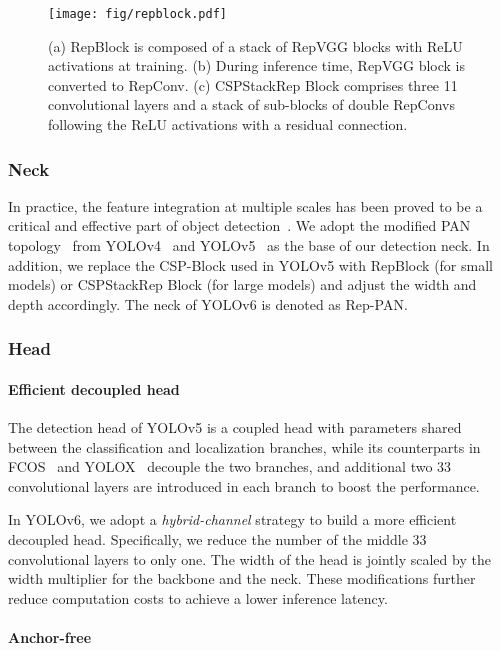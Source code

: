 \documentclass[10pt,twocolumn,letterpaper]{article}
\begin{document}
\begin{figure}[htp]
  \centering
  \texttt{[image: fig/repblock.pdf]}
  \caption{(a) RepBlock is composed of a stack of RepVGG blocks with ReLU activations at training. (b) During inference time, RepVGG block is converted to RepConv. (c) CSPStackRep Block comprises three 11 convolutional layers and a stack of sub-blocks of double RepConvs following the ReLU activations with a residual connection. }
  \label{fig:repblock}
\end{figure}
    
\subsubsection{Neck}
In practice, the feature integration at multiple scales has been proved to be a critical and effective part of object detection~\cite{lin2017feature, liu2018path, tan2020efficientdet, ghiasi2019fpn}. We adopt the modified PAN topology~\cite{liu2018path} from YOLOv4~\cite{bochkovskiy2020yolov4} and YOLOv5~\cite{yolov5} as the base of our detection neck. In addition, we replace the CSP-Block used in YOLOv5 with RepBlock (for small models) or CSPStackRep Block (for large models) and adjust the width and depth accordingly. The neck of YOLOv6 is denoted as Rep-PAN.

\subsubsection{Head}
  \paragraph{Efficient decoupled head} 
  The detection head of YOLOv5 is a coupled head with parameters shared between the classification and localization branches, while its counterparts in FCOS~\cite{tian2019fcos} and YOLOX~\cite{ge2021yolox} decouple the two branches, and additional two 33 convolutional layers are introduced in each branch to boost the performance. 

  In YOLOv6, we adopt a \emph{hybrid-channel} strategy to build a more efficient decoupled head. Specifically, we reduce the number of the middle 33 convolutional layers to only one. The width of the head is jointly scaled by the width multiplier for the backbone and the neck. These modifications further reduce computation costs to achieve a lower inference latency.


  \paragraph{Anchor-free}
\end{document}
